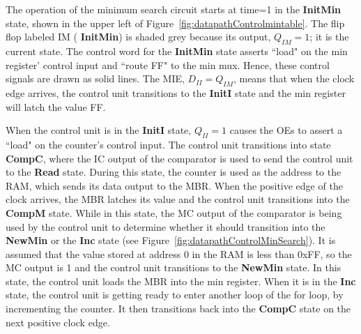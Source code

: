 The operation of the minimum search circuit starts at time=1
in the \textbf{ InitMin} state, shown in the upper left of 
Figure~\ref{fig:datapathControlmintable}.  The flip flop labeled IM (\textbf{ InitMin}) 
is shaded grey because its output, $Q_{IM}=1$; it is the current state.  
The control word for the \textbf{ InitMin} state asserts ``load" on the 
min register' control input and ``route FF" to the min mux. Hence, 
these control signals are drawn as solid lines.
The MIE, $D_{II} = Q_{IM}$, means that when the clock edge 
arrives, the control unit transitions to the \textbf{ InitI} 
state and the min register will latch the value FF.

When the control unit is in the \textbf{ InitI} state, $Q_{II}=1$
causes the OEs to assert a ``load" on the counter's control
input.  The control unit transitions into state \textbf{ CompC},
where the IC output of the comparator is used
to send the control unit to the \textbf{ Read} state.
During this state, the counter is used as the address to
the RAM, which sends its data output to the MBR.  When the 
positive edge of the clock arrives, the MBR latches its
value and the control unit transitions into the \textbf{ CompM} 
state.  While in this state, the MC output of the comparator
is being used by the control unit to determine whether it 
should transition into the \textbf{ NewMin} or the \textbf{ Inc} state
(see Figure~\ref{fig:datapathControlMinSearch}).  It is assumed that the 
value stored at address 0 in the RAM is less than 0xFF, so
the MC output is 1 and the control unit transitions to the 
\textbf{ NewMin} state.  In this state, the control 
unit loads the MBR into the min register.  When it is in the \textbf{ Inc}
state, the control unit is getting ready to enter another loop of the
for loop, by incrementing the counter.  It then transitions
back into the \textbf{ CompC} state on the next positive clock edge.


